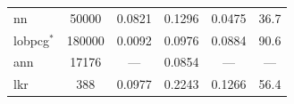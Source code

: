 \documentclass[final,twocolumn,12pt]{elsarticle}
\newcommand{\NA}{---} %
\begin{document}
\begin{table}
\begin{tabular}{lccccc}
\gls{nn}                                                      & \num{50000}  & \num{0.0821} & \num{0.1296} & \num{0.0475} & \num{36.7} \\
\gls{lobpcg}$^*$   \cite{shenDeterminingGrainBoundary2019}        & \num{180000} & \num{0.0092} & \num{0.0976} & \num{0.0884} & \num{90.6} \\
\gls{ann}   \cite{restrepoUsingArtificialNeural2014} & \num{17176}  & \NA          & \num{0.0854} & \NA          & \NA        \\
\gls{lkr}   \cite{chesserLearningGrainBoundary2020}           & \num{388}    & \num{0.0977} & \num{0.2243} & \num{0.1266} & \num{56.4} \\ \bottomrule
\end{tabular}
\label{tab:rmse-error-comparison}
\end{table}
\end{document}
